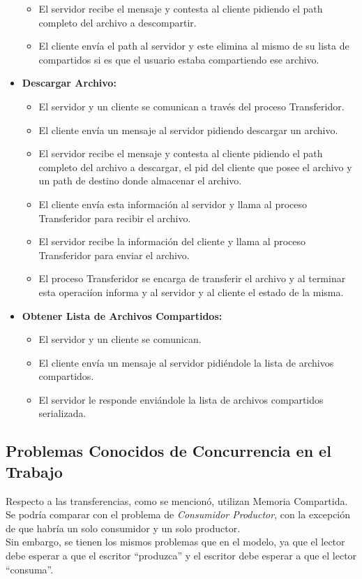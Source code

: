 \documentclass[a4paper,10pt]{article}
\begin{document}
\begin{itemize}
\begin{itemize}
						\item El servidor recibe el mensaje y contesta al cliente pidiendo el path completo del
								archivo a descompartir.
						\item El cliente env\'ia el path al servidor y este elimina al mismo de su lista de compartidos
								si es que el usuario estaba compartiendo ese archivo.
					\end{itemize}
				\item \textbf{Descargar Archivo:}
					\begin{itemize}
						\item El servidor y un cliente se comunican a trav\'es del proceso Transferidor.
						\item El cliente env\'ia un mensaje al servidor pidiendo descargar un archivo.
						\item El servidor recibe el mensaje y contesta al cliente pidiendo el path completo del 
									archivo a descargar, el pid del cliente que posee el archivo y un path de destino
									donde almacenar el archivo.
						\item El cliente env\'ia esta informaci\'on al servidor y llama al proceso Transferidor para
									recibir el archivo.
						\item El servidor recibe la informaci\'on del cliente y llama al proceso Transferidor para
									enviar el archivo.
						\item El proceso Transferidor se encarga de transferir el archivo y al terminar esta operaci\'ion 
									informa y al servidor y al cliente el estado de la misma.
					\end{itemize}
				
				\item \textbf{Obtener Lista de Archivos Compartidos:}
					\begin{itemize}
						\item El servidor y un cliente se comunican.
						\item El cliente env\'ia un mensaje al servidor pidi\'endole la lista de archivos compartidos.
						\item El servidor le responde envi\'andole la lista de archivos compartidos serializada.
					\end{itemize}
			\end{itemize}

	\subsection{Problemas Conocidos de Concurrencia en el Trabajo}
	Respecto a las transferencias, como se mencion\'o, utilizan Memoria Compartida. Se podr\'ia comparar con el 
	problema de \emph{Consumidor Productor}, con la excepci\'on de que habr\'ia un solo consumidor y un solo productor. \\
	Sin embargo, se tienen los mismos problemas que en el modelo, ya que el lector debe esperar a que el escritor
	 ``produzca'' 
	y el escritor debe esperar a que el lector ``consuma''.
	
\end{document}
